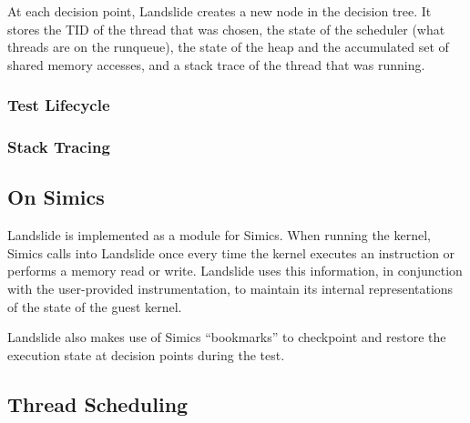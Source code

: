 At each decision point, Landslide creates a new node in the decision tree. It stores the TID of the thread that was chosen, the state of the scheduler (what threads are on the runqueue), the state of the heap and the accumulated set of shared memory accesses, and a stack trace of the thread that was running.

\subsubsection{Test Lifecycle}
\label{sec:components-test}

\subsubsection{Stack Tracing}

\subsection{On Simics}

Landslide is implemented as a module for Simics\cite{simics}. When running the kernel, Simics calls into Landslide once every time the kernel executes an instruction or performs a memory read or write. Landslide uses this information, in conjunction with the user-provided instrumentation, to maintain its internal representations of the state of the guest kernel.

Landslide also makes use of Simics ``bookmarks'' to checkpoint and restore the execution state at decision points during the test.

\subsection{Thread Scheduling}

